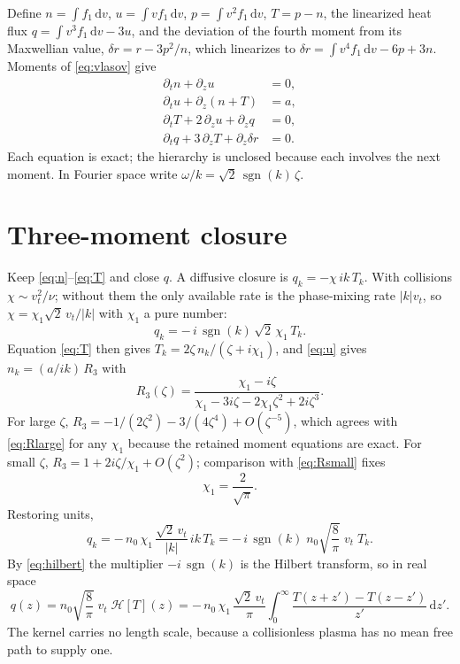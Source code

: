\documentclass[11pt]{article}
\newcommand{\sgn}{\operatorname{sgn}}
\newcommand{\Hil}{\mathcal{H}}
\newcommand{\dd}{\mathrm{d}}
\newcommand{\vt}{v_t}
\begin{document}
Define $n = \int f_1\,\dd v$, $u = \int v f_1\,\dd v$,
$p = \int v^2 f_1\,\dd v$, $T = p - n$, the linearized heat flux
$q = \int v^3 f_1\,\dd v - 3u$, and the deviation of the fourth moment from
its Maxwellian value, $\delta r = r - 3p^2/n$, which linearizes to
$\delta r = \int v^4 f_1\,\dd v - 6p + 3n$. Moments of \eqref{eq:vlasov} give
\begin{align}
  \partial_t n + \partial_z u &= 0, \label{eq:n}\\
  \partial_t u + \partial_z (n + T) &= a, \label{eq:u}\\
  \partial_t T + 2\,\partial_z u + \partial_z q &= 0, \label{eq:T}\\
  \partial_t q + 3\,\partial_z T + \partial_z \delta r &= 0. \label{eq:q}
\end{align}
Each equation is exact; the hierarchy is unclosed because each involves the
next moment. In Fourier space write $\omega/k = \sqrt{2}\,\sgn(k)\,\zeta$.

\section{Three-moment closure}

Keep \eqref{eq:n}--\eqref{eq:T} and close $q$. A diffusive closure is
$q_k = -\chi\, i k\, T_k$. With collisions $\chi \sim \vt^2/\nu$; without
them the only available rate is the phase-mixing rate $|k|\vt$, so
$\chi = \chi_1 \sqrt{2}\,\vt/|k|$ with $\chi_1$ a pure number:
\begin{equation}
  q_k = -\,i\,\sgn(k)\,\sqrt{2}\,\chi_1\,T_k .
  \label{eq:closure3}
\end{equation}
Equation \eqref{eq:T} then gives $T_k = 2\zeta\,n_k/(\zeta + i\chi_1)$, and
\eqref{eq:u} gives $n_k = (a/ik)\,R_3$ with
\begin{equation}
  R_3(\zeta) = \frac{\chi_1 - i\zeta}
                    {\chi_1 - 3i\zeta - 2\chi_1\zeta^2 + 2i\zeta^3}.
  \label{eq:R3}
\end{equation}
For large $\zeta$, $R_3 = -1/(2\zeta^2) - 3/(4\zeta^4) + O(\zeta^{-5})$,
which agrees with \eqref{eq:Rlarge} for any $\chi_1$ because the retained
moment equations are exact. For small $\zeta$,
$R_3 = 1 + 2i\zeta/\chi_1 + O(\zeta^2)$; comparison with \eqref{eq:Rsmall}
fixes
\begin{equation}
  \chi_1 = \frac{2}{\sqrt{\pi}} .
\end{equation}
Restoring units,
\begin{equation}
  q_k = -\,n_0\,\chi_1\,\frac{\sqrt{2}\,\vt}{|k|}\,i k\,T_k
      = -\,i\,\sgn(k)\; n_0\sqrt{\frac{8}{\pi}}\;\vt\;T_k .
\end{equation}
By \eqref{eq:hilbert} the multiplier $-i\,\sgn(k)$ is the Hilbert transform,
so in real space
\begin{equation}
  q(z) = n_0\sqrt{\frac{8}{\pi}}\;\vt\;\Hil[T](z)
       = -\,n_0\,\chi_1\,\frac{\sqrt{2}\,\vt}{\pi}
         \int_0^\infty \frac{T(z+z') - T(z-z')}{z'}\,\dd z' .
  \label{eq:real3}
\end{equation}
The kernel carries no length scale, because a collisionless plasma has no
mean free path to supply one.
\end{document}
